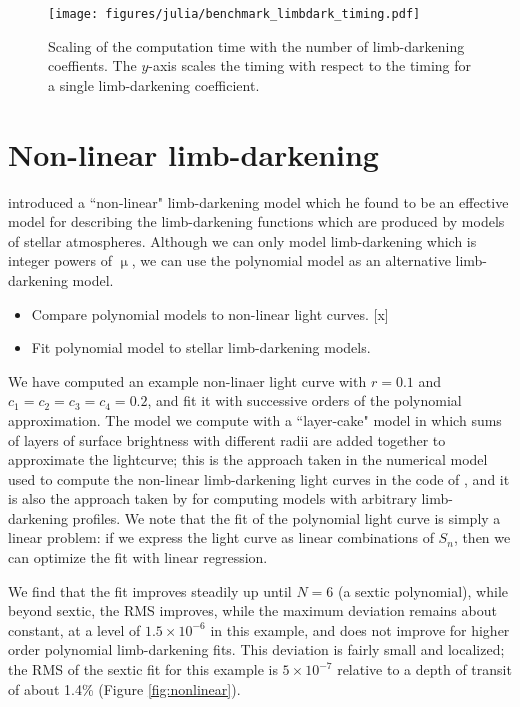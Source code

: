 \documentclass[modern]{aastex61}
\begin{document}
\begin{figure}
    \begin{centering}
    \texttt{[image: figures/julia/benchmark\_limbdark\_timing.pdf]}
    \caption{Scaling of the computation time with the number of
    limb-darkening coeffients.  The $y$-axis scales the timing with respect
    to the timing for a single limb-darkening coefficient.}
    \label{fig:nlimb}
    \end{centering}
\end{figure}

\section{Non-linear limb-darkening}

\citet{Claret2000} introduced a ``non-linear" limb-darkening model which
he found to be an effective model for describing the limb-darkening functions
which are produced by models of stellar atmospheres.
Although we can only model limb-darkening which is integer powers of $\upmu$,
we can use the polynomial model as an alternative limb-darkening model.

\begin{itemize}
\item Compare polynomial models to non-linear light curves. [x]
\item Fit polynomial model to stellar limb-darkening models.
\end{itemize}

We have computed an example non-linaer light curve with $r=0.1$ and
$c_1=c_2=c_3=c_4=0.2$, and fit it with successive orders of the
polynomial approximation.  The model we compute with a ``layer-cake"
model in which sums of layers of surface brightness with different
radii are added together to approximate the lightcurve;  this
is the approach taken in the numerical model used to compute the
non-linear limb-darkening light curves in the code of \citet{MandelAgol2002},
and it is also the approach taken by \citet{Kreidberg2015} for
computing models with arbitrary limb-darkening profiles.
We note that the fit of the polynomial light curve is simply a linear 
problem:  if we express the light curve as linear combinations
of $S_n$, then we can optimize the fit with linear regression.

We find that the fit improves steadily up until $N=6$ (a sextic
polynomial), while beyond sextic, the RMS improves, while the
maximum deviation remains about constant, at a level of $1.5 \times 10^{-6}$
in this example, and does not improve for higher order polynomial
limb-darkening fits.  This deviation is fairly small and localized;
the RMS of the sextic fit for this example is $5 \times 10^{-7}$
relative to a depth of transit of about 1.4\% (Figure \ref{fig:nonlinear}).
\end{document}
